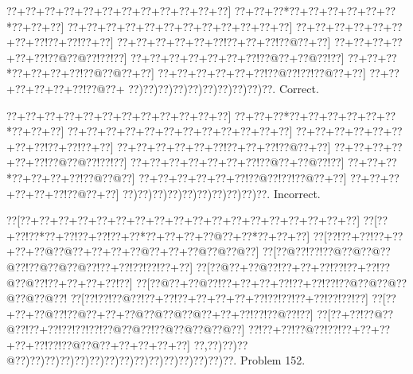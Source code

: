 \documentclass[a5paper]{article}
\begin{document}
\begin{center}
{\goo
\0??+\0??+\0??+\0??+\0??+\0??+\0??+\0??+\0??+\0??+\0??+\0??]
\0??+\0??+\0??*\0??+\0??+\0??+\0??+\0??+\0??*\0??+\0??+\0??]
\0??+\0??+\0??+\0??+\0??+\0??+\0??+\0??+\0??+\0??+\0??+\0??]
\0??+\0??+\0??+\0??+\0??+\0??+\0??+\0??!\0??+\0??!\0??+\0??]
\0??+\0??+\0??+\0??+\0??+\0??!\0??+\0??+\0??!\0??@\0??+\0??]
\0??+\0??+\0??+\0??+\0??+\0??!\0??@\0??@\0??!\0??!\0??]
\0??+\0??+\0??+\0??+\0??+\0??+\0??!\0??@\0??+\0??@\0??!\0??]
\0??+\0??+\0??*\0??+\0??+\0??+\0??!\0??@\0??@\0??+\0??]
\0??+\0??+\0??+\0??+\0??+\0??!\0??@\0??!\0??!\0??@\0??+\0??]
\0??+\0??+\0??+\0??+\0??+\0??!\0??@\0??+
\0??)\0??)\0??)\0??)\0??)\0??)\0??)\0??)\0??)\0??.
}
Correct. 

\end{center}
\begin{center}
{\goo
\0??+\0??+\0??+\0??+\0??+\0??+\0??+\0??+\0??+\0??+\0??+\0??]
\0??+\0??+\0??*\0??+\0??+\0??+\0??+\0??+\0??*\0??+\0??+\0??]
\0??+\0??+\0??+\0??+\0??+\0??+\0??+\0??+\0??+\0??+\0??+\0??]
\0??+\0??+\0??+\0??+\0??+\0??+\0??+\0??!\0??+\0??!\0??+\0??]
\0??+\0??+\0??+\0??+\0??+\0??!\0??+\0??+\0??!\0??@\0??+\0??]
\0??+\0??+\0??+\0??+\0??+\0??!\0??@\0??@\0??!\0??!\0??]
\0??+\0??+\0??+\0??+\0??+\0??+\0??!\0??@\0??+\0??@\0??!\0??]
\0??+\0??+\0??*\0??+\0??+\0??+\0??!\0??@\0??@\0??]
\0??+\0??+\0??+\0??+\0??+\0??!\0??@\0??!\0??!\0??@\0??+\0??]
\0??+\0??+\0??+\0??+\0??+\0??!\0??@\0??+\0??]
\0??)\0??)\0??)\0??)\0??)\0??)\0??)\0??)\0??)\0??.
}
Incorrect. 

\end{center}
\newpage
\begin{center}
{\goo
\0??[\0??+\0??+\0??+\0??+\0??+\0??+\0??+\0??+\0??+\0??+\0??+\0??+\0??+\0??+\0??+\0??+\0??+\0??]
\0??[\0??+\0??!\0??*\0??+\0??!\0??+\0??!\0??+\0??*\0??+\0??+\0??+\0??@\0??+\0??*\0??+\0??+\0??]
\0??[\0??!\0??+\0??!\0??+\0??+\0??+\0??@\0??@\0??+\0??+\0??+\0??@\0??+\0??+\0??@\0??@\0??@\0??]
\0??[\0??@\0??!\0??!\0??@\0??@\0??@\0??@\0??!\0??@\0??@\0??@\0??!\0??+\0??!\0??!\0??!\0??+\0??]
\0??[\0??@\0??+\0??@\0??!\0??+\0??+\0??!\0??!\0??+\0??!\0??@\0??@\0??!\0??+\0??+\0??+\0??!\0??]
\0??[\0??@\0??+\0??@\0??!\0??+\0??+\0??+\0??!\0??+\0??!\0??!\0??@\0??@\0??@\0??@\0??@\0??@\0??!
\0??[\0??!\0??!\0??@\0??!\0??+\0??!\0??+\0??+\0??+\0??+\0??!\0??!\0??!\0??+\0??!\0??!\0??!\0??]
\0??[\0??+\0??+\0??@\0??!\0??@\0??+\0??+\0??@\0??@\0??@\0??@\0??+\0??+\0??!\0??!\0??@\0??!\0??]
\0??[\0??+\0??!\0??@\0??@\0??!\0??+\0??!\0??!\0??!\0??!\0??@\0??@\0??!\0??@\0??@\0??@\0??@\0??]
\0??!\0??+\0??!\0??@\0??!\0??!\0??+\0??+\0??+\0??+\0??!\0??!\0??@\0??@\0??+\0??+\0??+\0??+\0??]
\0??,\0??)\0??)\0??@\0??)\0??)\0??)\0??)\0??)\0??)\0??)\0??)\0??)\0??)\0??)\0??)\0??)\0??)\0??.
}
Problem 152.

\end{center}
\end{document}

